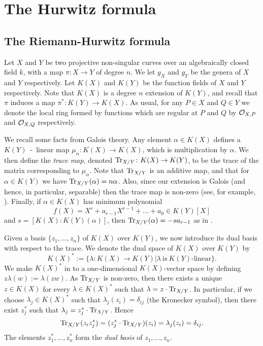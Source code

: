 \chapter{The Hurwitz formula} \label{Chapter:hurwitzformula}
\section{The Riemann-Hurwitz formula}\label{Hurwitzsection}

Let $X$ and $Y$ be two projective non-singular curves over an algebraically closed field $k$, with a map $\pi \colon X \rightarrow Y$ of degree $n$.
We let $g_X$ and $g_Y$ be the genera of $X$ and $Y$ respectively.
Let $K(X)$ and $K(Y)$ be the function fields of $X$ and $Y$ respectively.
Note that $K(X)$ is a degree $n$ extension of $K(Y)$, and recall that $\pi$ induces a map $\pi^*\colon K(Y) \rightarrow K(X)$.
As usual, for any $P \in X$ and $Q \in Y$ we denote the local ring formed by functions which are regular at $P$ and $Q$ by ${\cal O}_{X,P}$ and ${\cal O}_{X,Q}$ respectively.

We recall some facts from Galois theory.
Any element $\alpha \in K(X)$ defines a $K(Y)$~-~linear map $\mu_{\alpha} \colon  K(X) \rightarrow K(X)$, which is multiplication by $\alpha$.
We then define the {\em trace map}, denoted $\operatorname{Tr}_{X/Y}\colon  K(X) \rightarrow K(Y)$, to be the trace of the matrix corresponding to $\mu_{\alpha}$.
Note that $\operatorname{Tr}_{X/Y}$ is an additive map, and that for $\alpha \in K(Y)$ we have $\operatorname{Tr}_{X/Y}(\alpha) = n \alpha$.
Also, since our extension is Galois (and hence, in particular, separable) then the trace map is non-zero (see, for example, \cite[Appendix A]{stichtenoth}).
Finally, if $\alpha \in K(X)$ has minimum polynomial 
\[
 f(X) = X^r + a_{r-1}X^{r-1} + \ldots +a_0 \in K(Y)[X]
\]
 and $s= [K(X):K(Y)(\alpha)]$, then $\operatorname{Tr}_{X/Y}(\alpha) = -sa_{r-1}$ as in \cite[Appendix A]{stichtenoth}.

Given a basis $\{z_1,\ldots,z_n\}$ of $K(X)$ over $K(Y)$, we now introduce its dual basis with respect to the trace.
We denote the dual space of $K(X)$ over $K(Y)$ by \[K(X)^*:=\{\lambda \colon K(X) \rightarrow K(Y)| \lambda\ \text{is}\ K(Y)\text{-linear}\}.\]
We make $K(X)^*$ in to a one-dimensional $K(X)$-vector space by defining $z \lambda(w):=\lambda(z w)$.
As $\operatorname{Tr}_{X/Y}$ is non-zero, then there exists a unique $z\in K(X)$ for every $\lambda \in K(X)^*$ such that $\lambda = z\cdot \operatorname{Tr}_{X/Y}$.
In particular, if we choose $\lambda_j\in K(X)^*$ such that $\lambda_j(z_i) = \delta_{ij}$ (the Kronecker symbol), then there exist $z_j^*$ such that $\lambda_j = z_j^*\cdot \operatorname{Tr}_{X/Y}$.
Hence
\[
 \operatorname{Tr}_{X/Y}(z_iz_j^*) = (z_j^*\cdot \operatorname{Tr}_{X/Y})(z_i) = \lambda_j(z_i) = \delta_{ij}.
\]
The elements $z_1^*, \ldots , z_n^*$ form the {\em dual basis} of $z_1, \ldots , z_n$.

